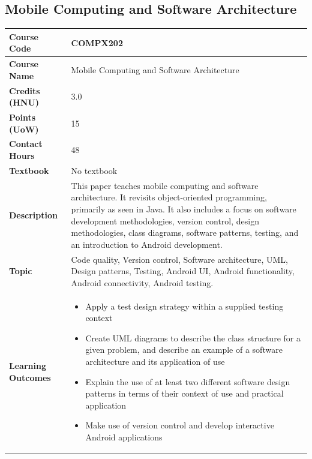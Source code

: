 \documentclass{article}
\begin{document}
\subsection[COMPX202 Mobile Computing and Software Architecture]{Mobile Computing and Software Architecture}
\renewcommand{\arraystretch}{1.5} %
\begin{longtable}{|p{3cm}|p{10cm}|}
\hline
\textbf{Course Code} & COMPX202 \\
\hline
\textbf{Course Name} & Mobile Computing and Software Architecture \\
\hline
\textbf{Credits (HNU)} & 3.0 \\
\hline
\textbf{Points (UoW)} & 15 \\
\hline
\textbf{Contact Hours} & 48 \\
\hline
\textbf{Textbook} & No textbook \\
\hline
\textbf{Description} & This paper teaches mobile computing and software architecture. It revisits object-oriented programming, primarily as seen in Java. It also includes a focus on software development methodologies, version control, design methodologies, class diagrams, software patterns, testing, and an introduction to Android development.\\
\hline
\textbf{Topic} & Code quality, 
Version control, 
Software architecture, 
UML, 
Design patterns, 
Testing, 
Android UI, 
Android functionality, 
Android connectivity, 
Android testing. \\
\hline
\textbf{Learning Outcomes} & 
    \begin{itemize}
        \item Apply a test design strategy within a supplied testing context
        \item Create UML diagrams to describe the class structure for a given problem, and describe an example of a software architecture and its application of use
        \item Explain the use of at least two different software design patterns in terms of their context of use and practical application
        \item Make use of version control and develop interactive Android applications
    \end{itemize} \\
\hline
\end{longtable}
\end{document}
